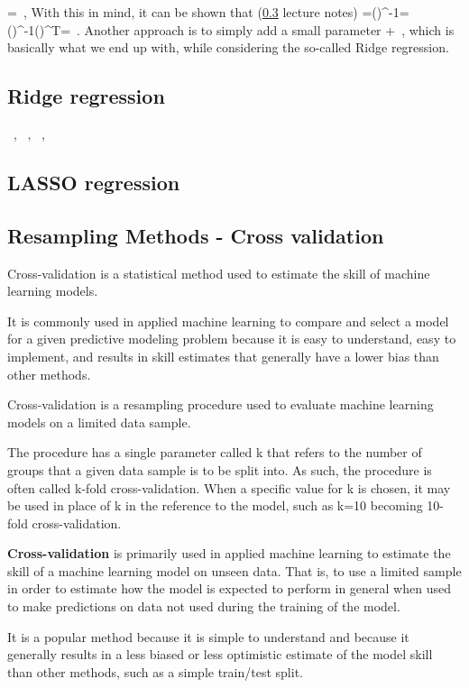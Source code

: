 \be{}
=\, ,
\ee
With this in mind, it can be shown that (\ref{} lecture notes)
\be{}
=\left(\right)^{-1}=\left(\right)^{-1}\left(\right)^T=\, .
\ee
Another approach is to simply add a small parameter
\be{}
\rightarrow{}+\, ,
\ee
which is basically what we end up with, while considering the so-called Ridge regression.

\subsection{Ridge regression}

\be{}
\, ,
\ee
\be{}
\, ,
\ee
\be{}
\, ,
\ee

\subsection{LASSO regression}

\subsection{Resampling Methods - Cross validation}
Cross-validation is a statistical method used to estimate the skill of machine learning models.

It is commonly used in applied machine learning to compare and select a model for a given predictive modeling problem because it is easy to understand, easy to implement, and results in skill estimates that generally have a lower bias than other methods.

Cross-validation is a resampling procedure used to evaluate machine learning models on a limited data sample.

The procedure has a single parameter called k that refers to the number of groups that a given data sample is to be split into. As such, the procedure is often called k-fold cross-validation. When a specific value for k is chosen, it may be used in place of k in the reference to the model, such as k=10 becoming 10-fold cross-validation.

\textbf{Cross-validation} is primarily used in applied machine learning to estimate the skill of a machine learning model on unseen data. That is, to use a limited sample in order to estimate how the model is expected to perform in general when used to make predictions on data not used during the training of the model.

It is a popular method because it is simple to understand and because it generally results in a less biased or less optimistic estimate of the model skill than other methods, such as a simple train/test split.

